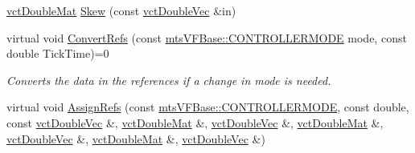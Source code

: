 \begin{DoxyCompactItemize}
\hyperlink{vct_dynamic_matrix_types_8h_a48f1eb2461d20a99e824ee5753a37c84}{vct\+Double\+Mat} \hyperlink{classmts_v_f_base_ab028f64fbea9be4e6d6529a3c1b7ad9b}{Skew} (const \hyperlink{vct_dynamic_vector_types_8h_ade4b3068c86fb88f41af2e5187e491c2}{vct\+Double\+Vec} \&in)
\item 
virtual void \hyperlink{classmts_v_f_base_acca2d183c9ca2659d3cf6c0af5120b55}{Convert\+Refs} (const \hyperlink{classmts_v_f_base_a742dd08f8b70bafeb746cec14d9ee974}{mts\+V\+F\+Base\+::\+C\+O\+N\+T\+R\+O\+L\+L\+E\+R\+M\+O\+D\+E} mode, const double Tick\+Time)=0
\begin{DoxyCompactList}\small\item\em Converts the data in the references if a change in mode is needed. \end{DoxyCompactList}\item 
virtual void \hyperlink{classmts_v_f_base_ad5081f5e82db7c18483dc5defbeae620}{Assign\+Refs} (const \hyperlink{classmts_v_f_base_a742dd08f8b70bafeb746cec14d9ee974}{mts\+V\+F\+Base\+::\+C\+O\+N\+T\+R\+O\+L\+L\+E\+R\+M\+O\+D\+E}, const double, const \hyperlink{vct_dynamic_vector_types_8h_ade4b3068c86fb88f41af2e5187e491c2}{vct\+Double\+Vec} \&, \hyperlink{vct_dynamic_matrix_types_8h_a48f1eb2461d20a99e824ee5753a37c84}{vct\+Double\+Mat} \&, \hyperlink{vct_dynamic_vector_types_8h_ade4b3068c86fb88f41af2e5187e491c2}{vct\+Double\+Vec} \&, \hyperlink{vct_dynamic_matrix_types_8h_a48f1eb2461d20a99e824ee5753a37c84}{vct\+Double\+Mat} \&, \hyperlink{vct_dynamic_vector_types_8h_ade4b3068c86fb88f41af2e5187e491c2}{vct\+Double\+Vec} \&, \hyperlink{vct_dynamic_matrix_types_8h_a48f1eb2461d20a99e824ee5753a37c84}{vct\+Double\+Mat} \&, \hyperlink{vct_dynamic_vector_types_8h_ade4b3068c86fb88f41af2e5187e491c2}{vct\+Double\+Vec} \&)
\end{DoxyCompactItemize}
